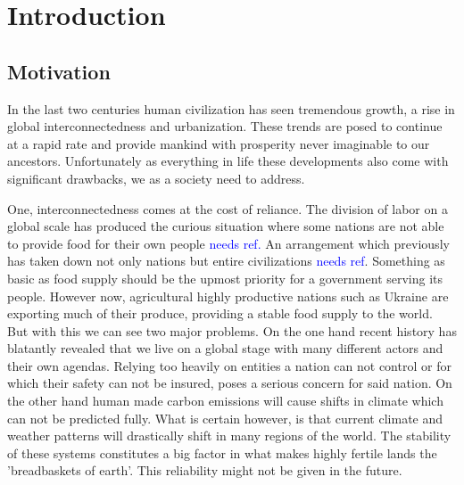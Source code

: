 \chapter{Introduction}
\label{chap:Introduction}


\section{Motivation}
\label{sec:Motivation}
In the last two centuries human civilization has seen tremendous growth, a rise in global interconnectedness and urbanization.
These trends are posed to continue at a rapid rate and provide mankind with prosperity never imaginable to our ancestors.
Unfortunately as everything in life these developments also come with significant drawbacks, we as a society need to address.

One, interconnectedness comes at the cost of reliance.
The division of labor on a global scale has produced the curious situation where some nations are not able to provide food for their own people \textcolor{blue}{needs ref.}
An arrangement which previously has taken down not only nations but entire civilizations \textcolor{blue}{needs ref}.
Something as basic as food supply should be the upmost priority for a government serving its people.
However now, agricultural highly productive nations such as Ukraine are exporting much of their produce, providing a stable food supply to the world.
But with this we can see two major problems.
On the one hand recent history has blatantly revealed that we live on a global stage with many different actors and their own agendas.
Relying too heavily on entities a nation can not control or for which their safety can not be insured, poses a serious concern for said nation.
On the other hand human made carbon emissions will cause shifts in climate which can not be predicted fully.
What is certain however, is that current climate and weather patterns will drastically shift in many regions of the world.
The stability of these systems constitutes a big factor in what makes highly fertile lands the 'breadbaskets of earth'.
This reliability might not be given in the future.

